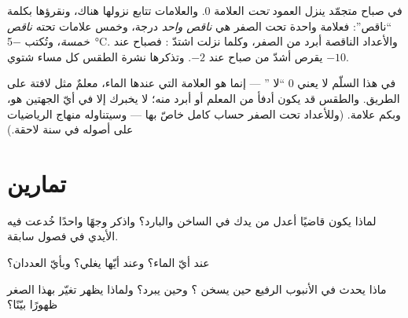 \begin{example}\label{ex:g3:temperature-thermometers:belowzero}
في صباح متجمّد ينزل العمود \emph{تحت} العلامة $0$. والعلامات
تتابع نزولها هناك، ونقرؤها بكلمة ``ناقص'': فعلامة واحدة تحت
الصفر هي \emph{ناقص واحد} درجة، وخمس علامات تحته \emph{ناقص
خمسة}، وتُكتب \qty{-5}{\celsius}. والأعداد الناقصة أبرد من الصفر،
وكلما نزلت اشتدّ : فصباح عند $-10$ يقرص أشدّ من صباح عند
$-2$. وتذكرها نشرة الطقس كل مساء شتوي.
\end{example}

\begin{remark}\label{rem:g3:temperature-thermometers:zero}
في هذا السلّم لا يعني $0$ ``لا '' --- إنما هو العلامة
التي  عندها الماء، معلمٌ مثل لافتة على الطريق. والطقس قد
يكون أدفأ من المعلم أو أبرد منه؛  لا يخبرك إلا في
أيّ الجهتين هو، وبكم علامة. (وللأعداد تحت الصفر حساب كامل خاصّ
بها --- وسيتناوله منهاج الرياضيات على أصوله في سنة لاحقة.)
\end{remark}

\section{تمارين}

\begin{exercise}[$\star$]\label{exo:g3:temperature-thermometers:1}
لماذا يكون  قاضيًا أعدل من يدك في الساخن والبارد؟
واذكر وجهًا واحدًا خُدعت فيه الأيدي في فصول سابقة.
\end{exercise}

\begin{exercise}[$\star$]\label{exo:g3:temperature-thermometers:2}
عند أيّ   الماء؟ وعند أيّها يغلي؟ وبأيّ 
العددان؟
\end{exercise}

\begin{exercise}[$\star$]\label{exo:g3:temperature-thermometers:3}
ماذا يحدث  في الأنبوب الرفيع حين يسخن ؟ وحين
يبرد؟ ولماذا يظهر تغيّر بهذا الصغر ظهورًا بيّنًا؟
\end{exercise}

